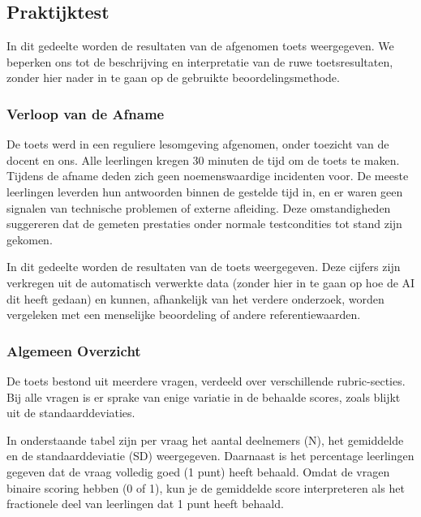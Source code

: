 \documentclass[12pt]{article}
\begin{document}
\pagebreak
\subsection{Praktijktest}
\begin{multicols}{2}
    

In dit gedeelte worden de resultaten van de afgenomen toets weergegeven. We beperken ons tot de beschrijving en interpretatie van de ruwe toetsresultaten, zonder hier nader in te gaan op de gebruikte beoordelingsmethode.

\subsubsection*{Verloop van de Afname}
De toets werd in een reguliere lesomgeving afgenomen, onder toezicht van de docent en ons. Alle leerlingen kregen 30 minuten de tijd om de toets te maken. Tijdens de afname deden zich geen noemenswaardige incidenten voor. De meeste leerlingen leverden hun antwoorden binnen de gestelde tijd in, en er waren geen signalen van technische problemen of externe afleiding. Deze omstandigheden suggereren dat de gemeten prestaties onder normale testcondities tot stand zijn gekomen.

In dit gedeelte worden de resultaten van de toets weergegeven. Deze cijfers zijn verkregen uit de automatisch verwerkte data (zonder hier in te gaan op hoe de AI dit heeft gedaan) en kunnen, afhankelijk van het verdere onderzoek, worden vergeleken met een menselijke beoordeling of andere referentiewaarden.

\subsubsection*{Algemeen Overzicht}
De toets bestond uit meerdere vragen, verdeeld over verschillende rubric-secties. Bij alle vragen is er sprake van enige variatie in de behaalde scores, zoals blijkt uit de standaarddeviaties.

\noindent In onderstaande tabel zijn per vraag het aantal deelnemers (N), het gemiddelde en de standaarddeviatie (SD) weergegeven. Daarnaast is het percentage leerlingen gegeven dat de vraag volledig goed (1 punt) heeft behaald. Omdat de vragen binaire scoring hebben (0 of 1), kun je de gemiddelde score interpreteren als het fractionele deel van leerlingen dat 1 punt heeft behaald.
\end{multicols}
\end{document}
